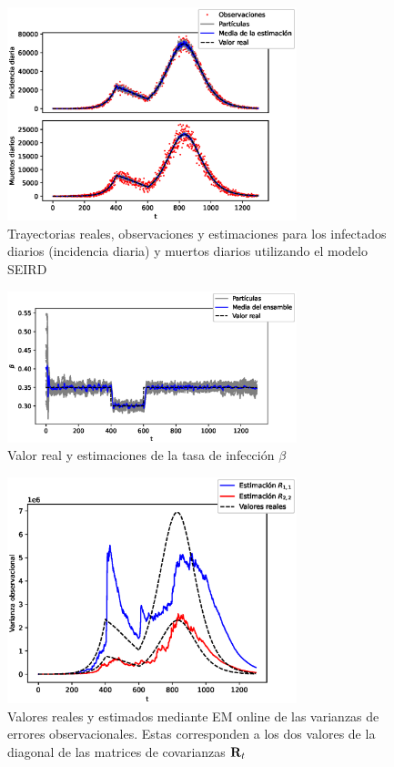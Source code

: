 \begin{figure}[h]
    \centering
    \includegraphics[width=0.75\textwidth]{figs/seird_online_em_aug_state_state_vars.eps}
    \caption{Trayectorias reales, observaciones y estimaciones para los infectados diarios (incidencia diaria) y muertos diarios utilizando el modelo SEIRD}
    \label{fig:seird_online_em_aug_state_state_vars}
\end{figure}
\begin{figure}[h]
    \centering
    \includegraphics[width=0.75\textwidth]{figs/seird_online_em_aug_state_beta.eps}
    \caption{Valor real y estimaciones de la tasa de infección $\beta$}
    \label{fig:seird_online_em_aug_state_beta}
\end{figure}
\begin{figure}[h]
    \centering
    \includegraphics[width=0.75\textwidth]{figs/seird_online_em_aug_state_R.eps}
    \caption{Valores reales y estimados mediante EM online de las varianzas de errores observacionales. Estas corresponden a los dos valores de la diagonal de las matrices de covarianzas $\mathbf{R}_t$}
    \label{fig:seird_online_em_aug_state_R}
\end{figure}

